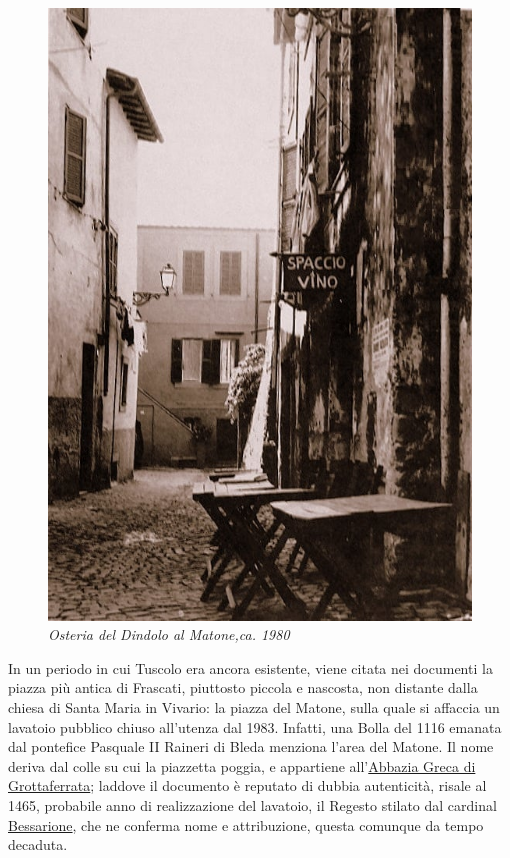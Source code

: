 \documentclass[
  letterpaper,
  DIV=11,
  numbers=noendperiod]{scrartcl}
\begin{document}
\begin{figure}

{\centering \includegraphics{../../images/2024/san_rocco/2matone.jpg}

}

\caption{\emph{Osteria del Dindolo al Matone,ca. 1980}}

\end{figure}

In un periodo in cui Tuscolo era ancora esistente, viene citata nei
documenti la piazza più antica di Frascati, piuttosto piccola e
nascosta, non distante dalla chiesa di Santa Maria in Vivario: la piazza
del Matone, sulla quale si affaccia un lavatoio pubblico chiuso
all'utenza dal 1983. Infatti, una Bolla del 1116 emanata dal pontefice
Pasquale II Raineri di Bleda menziona l'area del Matone. Il nome deriva
dal colle su cui la piazzetta poggia, e appartiene
all'\href{2016-12-31-momenti-fine-comandini.html\#parus\%C3\%ACa-unica-via}{Abbazia
Greca di Grottaferrata}; laddove il documento è reputato di dubbia
autenticità, risale al 1465, probabile anno di realizzazione del
lavatoio, il Regesto stilato dal cardinal
\href{2014-04-29-strade-fener-comandini.html\#partire}{Bessarione}, che
ne conferma nome e attribuzione, questa comunque da tempo decaduta.
\end{document}
